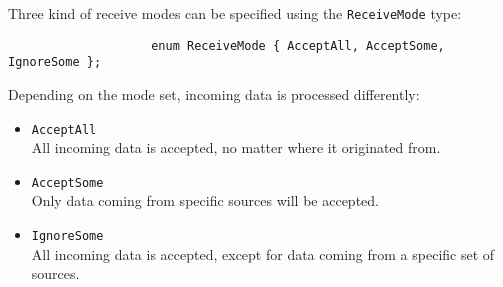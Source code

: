 \documentclass[12pt,a4paper]{article}
\begin{document}
				Three kind of receive modes can be specified using the {\tt ReceiveMode}
				type:
				\begin{verbatim}
					enum ReceiveMode { AcceptAll, AcceptSome, IgnoreSome };
				\end{verbatim}
				Depending on the mode set, incoming data is processed differently:
				\begin{itemize}
					\item {\tt AcceptAll}\\
						All incoming data is accepted, no matter where it originated
						from.
					\item {\tt AcceptSome}\\
						Only data coming from specific sources will be accepted.
					\item {\tt IgnoreSome}\\
						All incoming data is accepted, except for data coming from
						a specific set of sources.
				\end{itemize}
				
\end{document}
